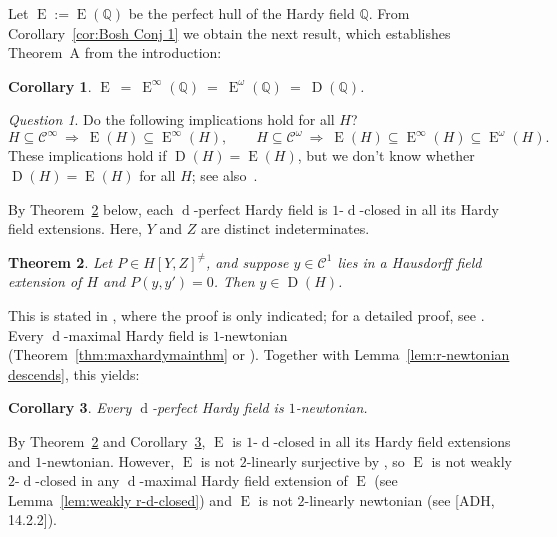 \documentclass[]{amsart}
\numberwithin{equation}{section}
\newcommand{\bbold}{\mathbb}
\def\Q { {\bbold Q} }
\def\c {\mathcal{C}}
\def \Ex{\operatorname{E}}
\def \Dx{\operatorname{D}}
\def \d{\operatorname{d}}
\newtheorem{theorem}{Theorem}[section]
\newtheorem{cor}[theorem]{Corollary}
\theoremstyle{definition}
\theoremstyle{remark}
\newtheorem*{question}{Question}
\def \Ginf{\mathcal{C}^{\infty}}
\def \Gom{\mathcal{C}^{\omega}}
\begin{document}
\noindent
Let   $\Ex:=\Ex(\Q)$ be the perfect hull of the Hardy field $\Q$. From  Corollary~\ref{cor:Bosh Conj 1} we obtain the next result, which 
establishes Theorem~A from the introduction:

\begin{cor}\label{cor:Bosh Conj 1 for H=Q}
 $\Ex\ =\ \Ex^\infty(\Q)\ =\ \Ex^{\omega}(\Q)\ =\ \Dx(\Q)$.
\end{cor}




\begin{question}
Do the following implications hold for all $H$?
$$H\subseteq\Ginf\ \Longrightarrow\ \Ex(H)\subseteq\Ex^\infty(H), \qquad H\subseteq\Gom\ \Longrightarrow\ \Ex(H)\subseteq\Ex^\infty(H)\subseteq\Ex^\omega(H).$$
These implications hold if $\Dx(H)=\Ex(H)$, but we don't know whether $\Dx(H)=\Ex(H)$ for all $H$; see also~\cite[p.~144]{Boshernitzan82}. 
\end{question}

 \noindent
By Theorem~\ref{thm:Bosh order 1} below, each $\d$-perfect Hardy field is $1$-$\d$-closed in all its Hardy field extensions.
 Here, $Y$ and $Z$ are distinct indeterminates.  

\begin{theorem}\label{thm:Bosh order 1}
Let  $P\in H[Y,Z]^{\neq}$, and suppose  $y\in\c^1$ lies in a Hausdorff field extension of $H$ and $P(y, y')=0$. Then $y\in \Dx(H)$. 
\end{theorem}


\noindent
This is stated in \cite[Theorem~11.8]{Boshernitzan82}, where the proof is only indicated; for a
detailed proof, see \cite[Theorem~6.3.14]{ADHmax}.
Every $\d$-maximal Hardy field is $1$-newtonian (Theorem~\ref{thm:maxhardymainthm} or \cite[Lemma~11.12]{ADH2}).
Together with   Lemma~\ref{lem:r-newtonian descends}, this yields:

\begin{cor}\label{cor:d-perfect => 1-newt}
Every $\d$-perfect Hardy field  is $1$-newtonian.
\end{cor}
 
 

\noindent
By Theorem~\ref{thm:Bosh order 1} and Corollary~\ref{cor:d-perfect => 1-newt},  $\Ex$ is $1$-$\d$-closed in all its Hardy field extensions and $1$-newtonian.
However, $\Ex$ is not $2$-linearly surjective by \cite[Proposition~3.7]{Boshernitzan87}, %
so $\Ex$ is not weakly $2$-$\d$-closed in any  $\d$-maximal Hardy field extension of $\Ex$ (see Lemma~\ref{lem:weakly r-d-closed})
and   $\Ex$ is not $2$-linearly newtonian (see [ADH, 14.2.2]).
\end{document}
